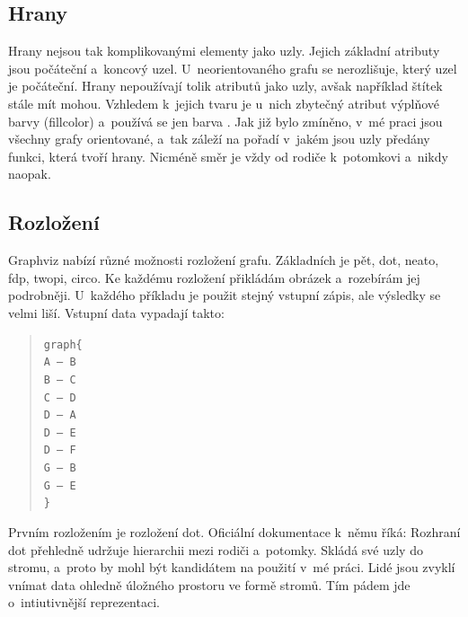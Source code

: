 \documentclass[color,table,oneside,nolot,nolof]{fithesis}
\begin{document}
\subsection{Hrany}
	Hrany nejsou tak komplikovanými elementy jako uzly. Jejich základní atributy jsou počáteční a~koncový uzel. U~neorientovaného grafu se nerozlišuje, který uzel je počáteční. Hrany 
	nepoužívají tolik atributů jako uzly, avšak například štítek stále mít mohou. Vzhledem k~jejich tvaru je u~nich zbytečný atribut výplňové barvy (fillcolor) a~používá se jen barva 
	.
	Jak již bylo zmíněno, v~mé praci jsou všechny grafy orientované, a~tak záleží na pořadí v~jakém jsou uzly předány funkci, která tvoří hrany. Nicméně směr je vždy od rodiče k~potomkovi
	a~nikdy naopak.
	
\subsection{Rozložení}
	Graphviz nabízí různé možnosti rozložení grafu. Základních je pět, dot, neato, fdp, twopi, circo. Ke každému rozložení přikládám obrázek a~rozebírám jej 
	podrobněji. U~každého příkladu je použit stejný vstupní zápis, ale výsledky se velmi liší. Vstupní data vypadají takto:
	\pagebreak[4]
	\begin{quotation}
		\texttt{graph\{\\
		A~-- B\\
		B -- C\\
		C -- D\\
		D -- A\\
		D -- E\\
		D -- F\\
		G -- B\\
		G -- E\\
	\}}
	\end{quotation}

	Prvním rozložením je rozložení dot. Oficiální dokumentace k~němu říká:
	\cite{graphviz_layout} 
	Rozhraní dot přehledně udržuje hierarchii mezi rodiči a~potomky. Skládá
	své uzly do stromu, a~proto by mohl být kandidátem na použití v~mé práci. Lidé jsou zvyklí vnímat data ohledně úložného prostoru ve formě stromů. Tím pádem jde o~intiutivnější
	reprezentaci.
\end{document}
